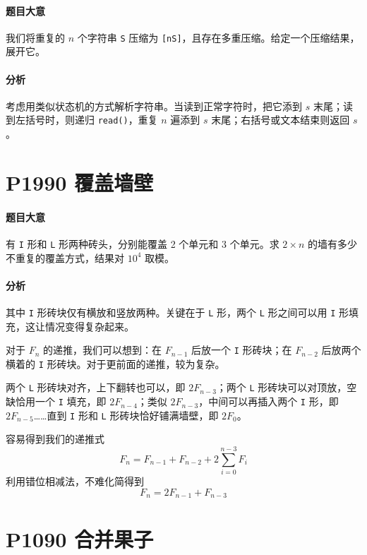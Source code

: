 \paragraph{题目大意}

我们将重复的 $n$ 个字符串 \verb`S` 压缩为 \verb`[nS]`，且存在多重压缩。给定一个压缩结果，展开它。

\paragraph{分析}

考虑用类似状态机的方式解析字符串。当读到正常字符时，把它添到 $s$ 末尾；读到左括号时，则递归 \verb`read()`，重复 $n$ 遍添到 $s$ 末尾；右括号或文本结束则返回 $s$。

\section{P1990 覆盖墙壁}

\paragraph{题目大意}

有 \verb`I` 形和 \verb`L` 形两种砖头，分别能覆盖 2 个单元和 3 个单元。求 $2 \times n$ 的墙有多少不重复的覆盖方式，结果对 $10^4$ 取模。

\paragraph{分析}

其中 \verb`I` 形砖块仅有横放和竖放两种。关键在于 \verb`L` 形，两个 \verb`L` 形之间可以用 \verb`I` 形填充，这让情况变得复杂起来。

对于 $F_n$ 的递推，我们可以想到：在 $F_{n-1}$ 后放一个 \verb`I` 形砖块；在 $F_{n-2}$ 后放两个横着的 \verb`I` 形砖块。对于更前面的递推，较为复杂。

两个 \verb`L` 形砖块对齐，上下翻转也可以，即 $2 F_{n-3}$；两个 \verb`L` 形砖块可以对顶放，空缺恰用一个 \verb`I` 填充，即 $2 F_{n-4}$；类似 $2F_{n-3}$，中间可以再插入两个 \verb`I` 形，即 $2 F_{n-5}$……直到 \verb`I` 形和 \verb`L` 形砖块恰好铺满墙壁，即 $2F_{0}$。

容易得到我们的递推式
\[ F_n = F_{n-1} + F_{n-2} + 2 \sum_{i=0}^{n-3} F_i \]
利用错位相减法，不难化简得到
\[ F_n = 2 F_{n-1} + F_{n-3} \]

\section{P1090 合并果子}

